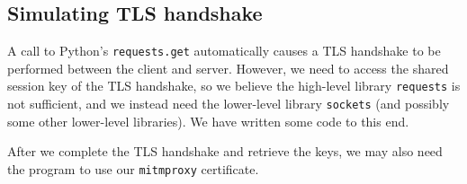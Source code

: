 \documentclass[conference]{IEEEtran}
\begin{document}

\subsection{Simulating TLS handshake}

A call to Python's \texttt{requests.get} automatically causes a TLS handshake to be performed between the client and server. However, we need to access the shared session key of the TLS handshake, so we believe the high-level library \texttt{requests} is not sufficient, and we instead need the lower-level library \texttt{sockets} (and possibly some other lower-level libraries). We have written some code to this end.

After we complete the TLS handshake and retrieve the keys, we may also need the program to use our \texttt{mitmproxy} certificate.

\end{document}
